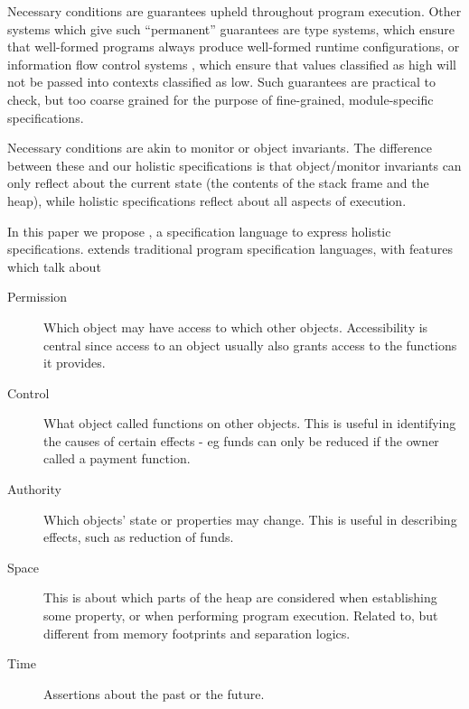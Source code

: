 Necessary conditions are guarantees upheld throughout program execution.
Other systems which give such ``permanent'' guarantees are    type systems, 
which ensure that well-formed programs  always produce well-formed runtime
configurations, or information flow control systems \cite{infoflow}, which ensure that values 
classified as high  will not be passed into contexts classified as low. 
Such  guarantees %
 are  practical to check, but   too coarse grained
for the purpose of fine-grained,  module-specific specifications. 

Necessary conditions are  akin to  monitor or object invariants\cite{Hoare74,Meyer97}. The difference between
these and our holistic specifications is that object/monitor invariants can only reflect about 
the current state (\ie the contents of the
stack frame and the heap), while   holistic specifications reflect about all aspects of execution.

In this paper we propose \Chainmail, a specification language to express holistic specifications. \Chainmail extends 
traditional program specification languages\cite{jml,Eiffel}, with features which talk about

\begin{description}
\item[Permission] Which object may have access to which other objects. 
Accessibility is central since access to an object usually also grants access to the functions it provides.

\item[Control] What object called functions on other objects. This is useful in identifying the causes of certain effects - eg 
funds can only be reduced if the owner called a payment function.

\item[Authority]  Which objects' state or properties may change. This is useful in describing effects, such as  reduction of funds.

\item[Space] This is about which parts of the heap are considered when establishing some property, or when 
performing program execution. 
Related to, but different from memory footprints and separation logics.

\item[Time] Assertions about the past or the future.
\end{description}


